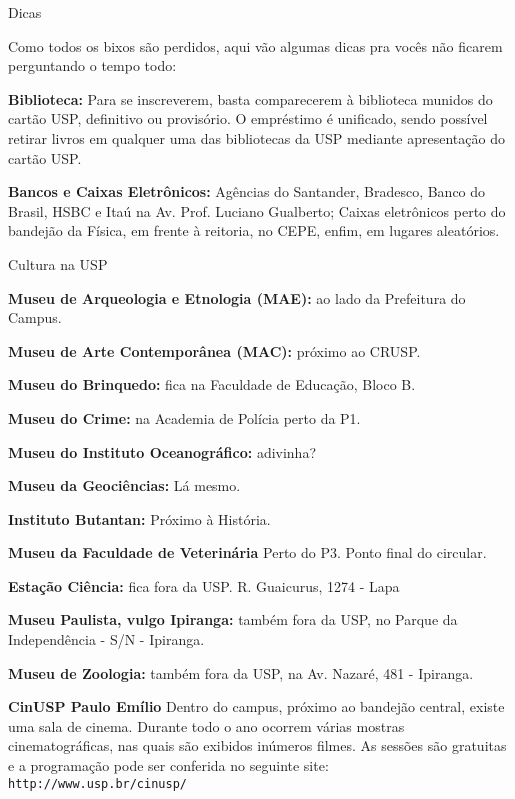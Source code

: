 \begin{secao}{Dicas}

Como todos os bixos são perdidos, aqui vão algumas dicas pra vocês não ficarem perguntando o tempo todo:

{\bf Biblioteca:} Para se inscreverem, basta comparecerem à biblioteca munidos do
cartão USP, definitivo ou provisório. O empréstimo é unificado, sendo possível
retirar livros em qualquer uma das bibliotecas da USP mediante apresentação do
cartão USP.


{\bf Bancos e Caixas Eletrônicos:} Agências do Santander, Bradesco,
Banco do Brasil, HSBC e Itaú na Av. Prof. Luciano
Gualberto; Caixas eletrônicos perto do bandejão da Física, em frente à reitoria,
no CEPE, enfim, em lugares aleatórios.

\begin{subsecao}{Cultura na USP}

{\bf Museu de Arqueologia e Etnologia (MAE):} ao lado da Prefeitura do Campus.

{\bf Museu de Arte Contemporânea (MAC):} próximo ao CRUSP.

{\bf Museu do Brinquedo:} fica na Faculdade de Educação, Bloco B.

{\bf Museu do Crime:} na Academia de Polícia perto da P1.

{\bf Museu do Instituto Oceanográfico:} adivinha?

{\bf Museu da Geociências:} Lá mesmo.

{\bf Instituto Butantan:} Próximo à História.

{\bf Museu da Faculdade de Veterinária} Perto do P3. Ponto final do circular.

{\bf Estação Ciência:} fica fora da USP. R. Guaicurus, 1274 - Lapa

{\bf Museu Paulista, vulgo Ipiranga: }também fora da USP, no Parque da
Independência - S/N  - Ipiranga.

{\bf Museu de Zoologia: }também fora da USP, na Av. Nazaré, 481  -
Ipiranga.

{\bf CinUSP Paulo Emílio} Dentro do campus, próximo ao bandejão central, existe uma sala de cinema. Durante todo o ano ocorrem várias mostras cinematográficas, nas quais são exibidos inúmeros filmes. As sessões são gratuitas e a programação pode ser conferida no seguinte site: {\tt http://www.usp.br/cinusp/}



\end{subsecao}
\end{secao}
